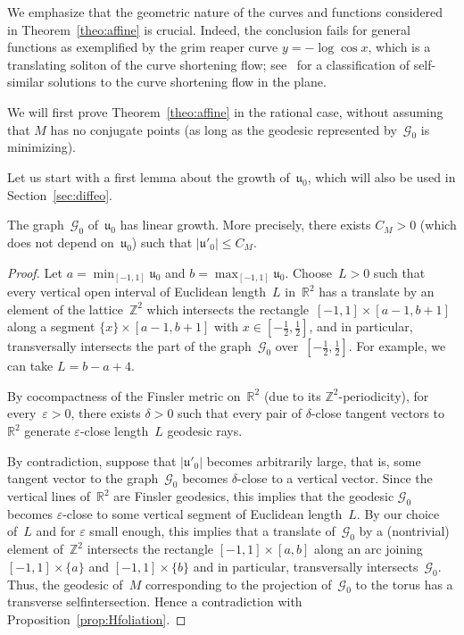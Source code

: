 \documentclass[AHL,Unicode,longabstracts,published]{cedram}
\newcommand{\GG}{\mathcal{G}}
\newcommand{\clG}{\mathcal{G}}
\newcommand{\Z}{\mathbb{Z}}
\newcommand{\R}{\mathbb{R}}
\newcommand{\bu}{\mathfrak{u}}
\begin{document}
\begin{rema}
We emphasize that the geometric nature of the curves and functions considered in Theorem~\ref{theo:affine} is crucial. Indeed, the conclusion fails for general functions as exemplified by the grim reaper curve $y = - \log \cos x$, which is a translating soliton of the curve shortening flow; see~\cite{H12} for a classification of self-similar solutions to the curve shortening flow in the plane.
\end{rema}


We will first prove Theorem~\ref{theo:affine} in the rational case, without assuming that $M$ has no conjugate points (as long as the geodesic represented by~$\clG_0$ is minimizing). 

Let us start with a first lemma about the growth of~$\bu_0$, which will also be used in Section~\ref{sec:diffeo}.

\begin{lemm}\label{lem:u0growth}
The graph~$\GG_0$ of~$\bu_0$ has linear growth. More precisely, there exists $C_M>0$ (which does not depend on~$\bu_0$) such that $|\bu'_0| \leq C_M$.
\end{lemm}

\begin{proof}
Let $a=\min_{[-1,1]} \bu_0$ and $b=\max_{[-1,1]} \bu_0$. Choose~$L>0$ such that every vertical open interval of Euclidean length~$L$ in~$\R^2$ has a translate by an element of the lattice~$\Z^2$ which intersects the rectangle~$[-1,1] \times [a-1,b+1]$ along a segment $\{x\} \times [a-1,b+1]$ with $x\in[-\frac{1}{2},\frac{1}{2}]$, and in particular, transversally intersects the part of the graph~$\GG_0$ over~$[-\frac{1}{2},\frac{1}{2}]$. For example, we can take $L=b-a+4$.

By cocompactness of the Finsler metric on~$\R^2$ (due to its $\Z^2$-periodicity), for every~$\varepsilon >0$, there exists $\delta>0$ such that every pair of $\delta$-close tangent vectors to~$\R^2$ generate $\varepsilon$-close length~$L$ geodesic rays.

By contradiction, suppose that $|\bu'_0|$ becomes arbitrarily large, that is, some tangent vector to the graph~$\GG_0$ becomes $\delta$-close to a vertical vector. Since the vertical lines of~$\R^2$ are Finsler geodesics, this implies that the geodesic $\GG_0$ becomes $\varepsilon$-close to some vertical segment of Euclidean length~$L$. By our choice of~$L$ and for $\varepsilon$ small enough, this implies that a translate of~$\GG_0$ by a (nontrivial) element of~$\Z^2$ intersects the rectangle $[-1,1]\times[a,b]$ along an arc joining $[-1,1]\times\{a\}$ and $[-1,1]\times\{b\}$ and in particular, transversally intersects~$\GG_0$. Thus, the geodesic of~$M$ corresponding to the projection of~$\GG_0$ to the torus has a transverse selfintersection. Hence a contradiction with Proposition~\ref{prop:Hfoliation}.
\end{proof}
\end{document}
